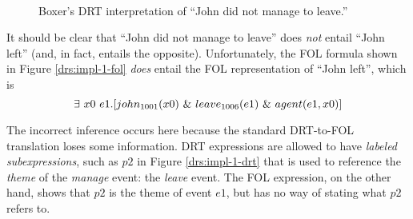 \begin{figure}
  \centering
  ~~~
  \caption{Boxer's DRT interpretation of ``John did not manage to leave.''}
  \label{drs:impl-1}
\end{figure}

It should be clear that ``John did not manage to leave'' does {\it not} entail
``John left'' (and, in fact, entails the opposite).  Unfortunately, the FOL
formula shown in Figure \ref{drs:impl-1-fol} {\it does} entail the FOL
representation of ``John left'', which is \[ \exists~
x0~e1.[john_{1001}(x0) ~\&~ leave_{1006}(e1) ~\&~ agent(e1, x0)] \]

The incorrect inference occurs here because the standard DRT-to-FOL translation
loses some information.  DRT expressions are allowed to have {\it labeled
subexpressions}, such as $p2$ in Figure \ref{drs:impl-1-drt} that is used to
reference the {\it theme} of the {\it manage} event: the {\it leave} event.  The
FOL expression, on the other hand, shows that $p2$ is the theme of event $e1$,
but has no way of stating what $p2$ refers to.

